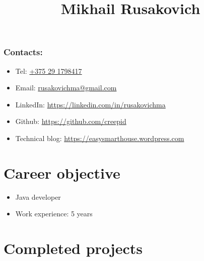 \documentclass[a4paper, 12pt]{article}
\title{Mikhail Rusakovich}
\author{}
\date{}
\begin{document}
\maketitle

\subsubsection*{Contacts:}
\begin{itemize}
    \item Tel: \href{tel:+375291798417}{+375 29 1798417}
    \item Email: \href{mailto:rusakovichma@gmail.com}{rusakovichma@gmail.com}
    \item LinkedIn: \href{https://linkedin.com/in/rusakovichma
}{https://linkedin.com/in/rusakovichma}
    \item Github: \href{https://github.com/creepid}{https://github.com/creepid}
    \item Technical blog: \href{https://easysmarthouse.wordpress.com}{https://easysmarthouse.wordpress.com}
\end{itemize}

\section*{Career objective}

    \begin{itemize}
        \item Java developer
        \item Work experience: 5 years
    \end{itemize}


\section*{Completed projects}
\end{document}
